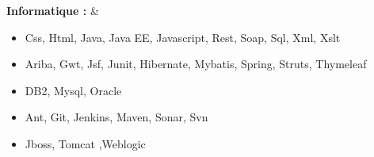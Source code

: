 \textbf{Informatique :}
& \begin{itemize}
	\item Css, Html, Java, Java EE, Javascript, Rest, Soap, Sql, Xml, Xslt
    \item Ariba, Gwt, Jsf, Junit, Hibernate, Mybatis, Spring, Struts, Thymeleaf
    \item DB2, Mysql, Oracle
    \item Ant, Git, Jenkins, Maven, Sonar, Svn 
    \item Jboss, Tomcat ,Weblogic
\end{itemize} \\
